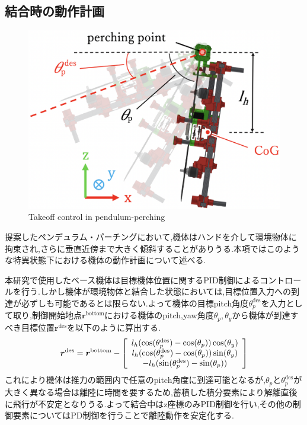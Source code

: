 \documentclass{jarticle}
\begin{document}
\subsection{結合時の動作計画}
\vspace{-2mm}
\begin{figure}[H]
  \centering
  \includegraphics[width=0.6\columnwidth]{figs/rset.eps}
  \caption{Takeoff control in pendulum-perching}
  \label{fig:rset}
  \vspace{-2mm}
\end{figure}
提案したペンデュラム・パーチングにおいて,機体はハンドを介して環境物体に拘束され,さらに垂直近傍まで大きく傾斜することがありうる.本項ではこのような特異状態下における機体の動作計画について述べる.

本研究で使用したベース機体は目標機体位置に関するPID制御によるコントロールを行う.しかし機体が環境物体と結合した状態においては,目標位置入力への到達が必ずしも可能であるとは限らない.よって機体の目標pitch角度$\theta_p^\text{des}$を入力として取り,制御開始地点$\bm{r}^\text{bottom}$における機体のpitch,yaw角度$\theta_p,\theta_y$から機体が到達すべき目標位置$\bm{r}^\text{des}$を以下のように算出する.
\vspace{-2mm}
\begin{equation}
  \bm{r}^\text{des} = \bm{r}^\text{bottom} -
  \left[ \begin{array}{c} l_h(\cos(\theta_p^\text{des}) - \cos(\theta_p))\cos(\theta_y) \\
      l_h(\cos(\theta_p^\text{des}) - \cos(\theta_p))\sin(\theta_y) \\
      -l_h(\sin(\theta_p^\text{des}) - \sin(\theta_p))
    \end{array} \right]
  \vspace{-1mm}
  \label{eq:rset}
\end{equation}
これにより機体は推力の範囲内で任意のpitch角度に到達可能となるが,$\theta_p$と$\theta_p^\text{des}$が大きく異なる場合は離陸に時間を要するため,蓄積した積分要素により解離直後に飛行が不安定となりうる.よって結合中はz座標のみPID制御を行い,その他の制御要素についてはPD制御を行うことで離陸動作を安定化する.
\end{document}
